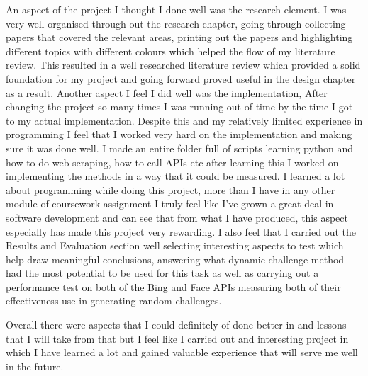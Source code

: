 \documentclass[12pt,a4paper]{article}
\begin{document}
An aspect of the project I thought I done well was the research element. I was very well organised through out the research chapter, going through collecting papers that covered the relevant areas, printing out the papers and highlighting different topics with different colours which helped the flow of my literature review. This resulted in a well researched literature review which provided a solid foundation for my project and going forward proved useful in the design chapter as a result. Another aspect I feel I did well was the implementation, After changing the project so many times I was running out of time by the time I got to my actual implementation. Despite this and my relatively limited experience in programming I feel that I worked very hard on the implementation and making sure it was done well. I made an entire folder full of scripts learning python and how to do web scraping, how to call APIs etc after learning this I worked on implementing the methods in a way that it could be measured. I learned a lot about programming while doing this project, more than I have in any other module of coursework assignment I truly feel like I've grown a great deal in software development and can see that from what I have produced, this aspect especially has made this project very rewarding. I also feel that I carried out the Results and Evaluation section well selecting interesting aspects to test which help draw meaningful conclusions, answering what dynamic challenge method had the most potential to be used for this task as well as carrying out a performance test on both of the Bing and Face APIs measuring both of their effectiveness use in generating random challenges. 

Overall there were aspects that I could definitely of done better in and lessons that I will take from that but I feel like I carried out and interesting project in which I have learned a lot and gained valuable experience that will serve me well in the future.

\newpage


\end{document}
